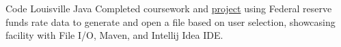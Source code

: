 {Code Louisville}
{Java}
{Completed coursework and \href{https://github.com/jacobarchambault/codeloujava}{project} using Federal reserve funds rate data to generate and open a file based on user selection, showcasing facility with 
	File I/O, Maven, and Intellij Idea IDE.}
